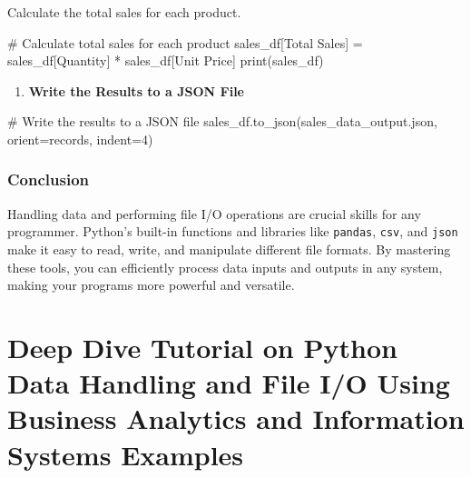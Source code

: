 \documentclass[
  letterpaper,
  DIV=11,
  numbers=noendperiod]{scrreprt}
\newenvironment{Shaded}{\begin{snugshade}}{\end{snugshade}}
\newcommand{\BuiltInTok}[1]{\textcolor[rgb]{0.00,0.23,0.31}{#1}}
\newcommand{\CommentTok}[1]{\textcolor[rgb]{0.37,0.37,0.37}{#1}}
\newcommand{\DecValTok}[1]{\textcolor[rgb]{0.68,0.00,0.00}{#1}}
\newcommand{\NormalTok}[1]{\textcolor[rgb]{0.00,0.23,0.31}{#1}}
\newcommand{\OperatorTok}[1]{\textcolor[rgb]{0.37,0.37,0.37}{#1}}
\newcommand{\StringTok}[1]{\textcolor[rgb]{0.13,0.47,0.30}{#1}}
\providecommand{\tightlist}{%
  \setlength{\itemsep}{0pt}\setlength{\parskip}{0pt}}\usepackage{longtable,booktabs,array}
\begin{document}
Calculate the total sales for each product.

\begin{Shaded}
\begin{Highlighting}[]
\CommentTok{\# Calculate total sales for each product}
\NormalTok{sales\_df[}\StringTok{\textquotesingle{}Total Sales\textquotesingle{}}\NormalTok{] }\OperatorTok{=}\NormalTok{ sales\_df[}\StringTok{\textquotesingle{}Quantity\textquotesingle{}}\NormalTok{] }\OperatorTok{*}\NormalTok{ sales\_df[}\StringTok{\textquotesingle{}Unit Price\textquotesingle{}}\NormalTok{]}
\BuiltInTok{print}\NormalTok{(sales\_df)}
\end{Highlighting}
\end{Shaded}

\begin{enumerate}
\def\labelenumi{\arabic{enumi}.}
\setcounter{enumi}{2}
\tightlist
\item
  \textbf{Write the Results to a JSON File}
\end{enumerate}

\begin{Shaded}
\begin{Highlighting}[]
\CommentTok{\# Write the results to a JSON file}
\NormalTok{sales\_df.to\_json(}\StringTok{\textquotesingle{}sales\_data\_output.json\textquotesingle{}}\NormalTok{, orient}\OperatorTok{=}\StringTok{\textquotesingle{}records\textquotesingle{}}\NormalTok{, indent}\OperatorTok{=}\DecValTok{4}\NormalTok{)}
\end{Highlighting}
\end{Shaded}

\subsection{Conclusion}\label{conclusion-8}

Handling data and performing file I/O operations are crucial skills for
any programmer. Python's built-in functions and libraries like
\texttt{pandas}, \texttt{csv}, and \texttt{json} make it easy to read,
write, and manipulate different file formats. By mastering these tools,
you can efficiently process data inputs and outputs in any system,
making your programs more powerful and versatile.


\chapter{Deep Dive Tutorial on Python Data Handling and File I/O Using
Business Analytics and Information Systems
Examples}\label{deep-dive-tutorial-on-python-data-handling-and-file-io-using-business-analytics-and-information-systems-examples}
\end{document}
